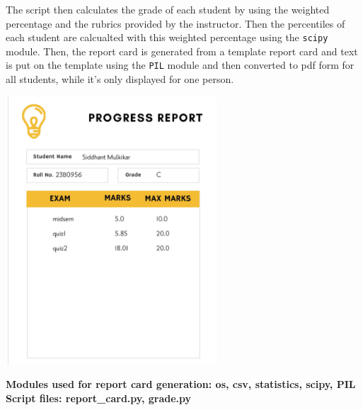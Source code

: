 \documentclass{article}
\begin{document}
The script then calculates the grade of each student by using the weighted percentage and the rubrics provided by the instructor. Then the percentiles of each student are calcualted with this weighted percentage using the \verb"scipy" module.
Then, the report card is generated from a template report card and text is put on the template using the \verb"PIL" module and then converted to pdf form for all students, while it's only displayed for one person.

\begin{center}
    \includegraphics[height=10cm,width=8cm]{report-card.png}
\end{center}

\textbf{Modules used for report card generation: os, csv, statistics, scipy, PIL}\\

\textbf{Script files: report\_card.py, grade.py}
\end{document}
